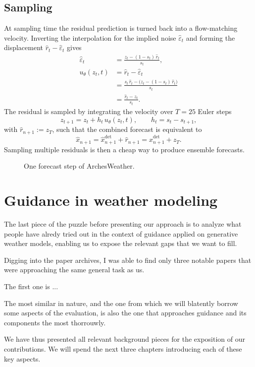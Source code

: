 \subsection{Sampling}
At sampling time the residual prediction is turned back into a flow-matching velocity.
Inverting the interpolation for the implied noise $\hat{\varepsilon}_t$ and forming the displacement $\hat{r}_t-\hat{\varepsilon}_t$ gives
\begin{align*}
    \hat{\varepsilon}_t &= \frac{z_t - (1-s_t)\,\hat{r}_t}{s_t}, \\
    u_\theta(z_t,t) &= \hat{r}_t - \hat{\varepsilon}_t \\
                    &= \frac{s_t\,\hat{r}_t - \big(z_t - (1-s_t)\,\hat{r}_t\big)}{s_t} \\
                    &= \frac{\hat{r}_t - z_t}{s_t}.
\end{align*}
The residual is sampled by integrating the velocity over $T=25$ Euler steps
$$
    z_{t+1} = z_t + h_t\,u_\theta(z_t,t), \qquad h_t = s_t - s_{t+1},
$$
with $\hat{r}_{n+1}:=z_T$,
such that the combined forecast is equivalent to
$$
    \hat{x}_{n+1} = \hat{x}^{\text{det}}_{n+1} + \hat{r}_{n+1}=\hat{x}^{\text{det}}_{n+1} + z_T.
$$
Sampling multiple residuals is then a cheap way to produce ensemble forecasts.

\begin{figure}[h]
    \centering
    \resizebox{\textwidth}{!}{}
    \caption{One forecast step of ArchesWeather.}
    \label{fig:archesweather-pipeline}
\end{figure}
\section{Guidance in weather modeling}

The last piece of the puzzle before presenting our approach is to analyze what people have alredy tried out in the context of guidance applied on generative weather models, enabling us to expose the relevant gaps that we want to fill.

Digging into the paper archives, I was able to find only three notable papers that were approaching the same general task as us.

The first one is ...

The most similar in nature, and the one from which we will blatently borrow some aspects of the evaluation, is also the one that approaches guidance and its components the most thorrouwly.

We have thus presented all relevant background pieces for the exposition of our contributions.
We will spend the next three chapters introducing each of these key aspects. 